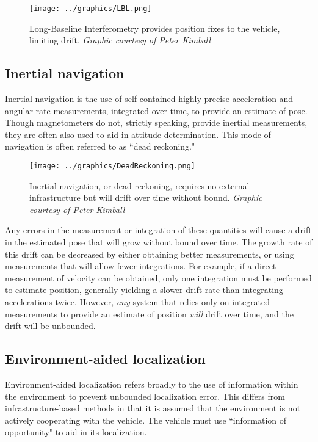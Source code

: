 \begin{figure}[htbp]
   \centering
   \texttt{[image: ../graphics/LBL.png]} %
   \caption{Long-Baseline Interferometry provides position fixes to the vehicle, limiting drift. \emph{Graphic courtesy of Peter Kimball}}
   \label{fig:LBL}
\end{figure}

\subsection{Inertial navigation}

Inertial navigation is the use of self-contained highly-precise acceleration and angular rate measurements, integrated over time, to provide an estimate of pose. Though magnetometers do not, strictly speaking, provide inertial measurements, they are often also used to aid in attitude determination. This mode of navigation is often referred to as ``dead reckoning."

\begin{figure}[htbp]
   \centering
   \texttt{[image: ../graphics/DeadReckoning.png]} %
   \caption{Inertial navigation, or dead reckoning, requires no external infrastructure but will drift over time without bound. \emph{Graphic courtesy of Peter Kimball}}
   \label{fig:inertialNav}
\end{figure}

Any errors in the measurement or integration of these quantities will cause a drift in the estimated pose that will grow without bound over time. The growth rate of this drift can be decreased by either obtaining better measurements, or using measurements that will allow fewer integrations. For example, if a direct measurement of velocity can be obtained, only one integration must be performed to estimate position, generally yielding a slower drift rate than integrating accelerations twice. However, \emph{any} system that relies only on integrated measurements to provide an estimate of position \emph{will} drift over time, and the drift will be unbounded. 

\subsection{Environment-aided localization}

Environment-aided localization refers broadly to the use of information within the environment to prevent unbounded localization error. This differs from infrastructure-based methods in that it is assumed that the environment is not actively cooperating with the vehicle. The vehicle must use ``information of opportunity" to aid in its localization. 

